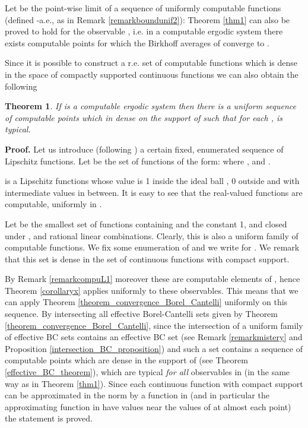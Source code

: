 \documentclass[copyright,creativecommons]{eptcs}
\newtheorem{theorem}{Theorem}
\numberwithin{equation}{section}
\begin{document}
Let  be the point-wise limit of a sequence of uniformly computable
functions  (defined -a.e., as in Remark \ref{remarkboundunif2}): Theorem \ref{thm1} can also be proved to hold for the observable ,
i.e. in a computable ergodic system there exists computable points for which
the Birkhoff averages of  converge to .

Since it is possible to construct a r.e. set of computable functions which
is dense in the space of compactly supported continuous functions we can
also obtain the following

\begin{theorem}
If  is a computable ergodic system then there is a uniform
sequence  of computable points which in dense on the support of 
such that for each ,  is typical.
\end{theorem}

{\bf Proof.}
Let us introduce (following \cite{Gac05}) a certain fixed, enumerated
sequence of Lipschitz functions. Let  be the set of
functions of the form:
where ,  and .

 is a Lipschitz functions whose value is 1 inside the
ideal ball , 0 outside  and with intermediate
values in between. It is easy to see that the real-valued functions  are computable,
uniformly in .

Let  be the smallest set of functions containing  and the constant 1, and closed under ,  and rational
linear combinations. Clearly, this is also a uniform family of computable
functions. We fix some enumeration  of  and
we write  for . We remark that
this set is dense in the set of continuous functions with compact support.

By Remark \ref{remarkcompuL1} moreover these are computable elements of , hence Theorem \ref{corollaryx} applies uniformly to these
observables. This means that we can apply Theorem \ref {theorem_convergence_Borel_Cantelli} uniformly on this sequence. By
intersecting all effective Borel-Cantelli sets given by Theorem \ref {theorem_convergence_Borel_Cantelli}, since the intersection of a uniform
family of effective BC sets contains an effective BC set (see Remark \ref {remarkmistery} and Proposition \ref{intersection_BC_proposition}) and such
a set contains a sequence of computable points which are dense in the
support of  (see Theorem \ref{effective_BC_theorem}), which are
typical {\em for all} observables in  (in the same way as in Theorem \ref{thm1}). Since each continuous function  with compact support can be
approximated in the  norm by a function in  (and
in particular the approximating function in  have values near
the values of  at almost each point) the statement is proved.
\end{document}

